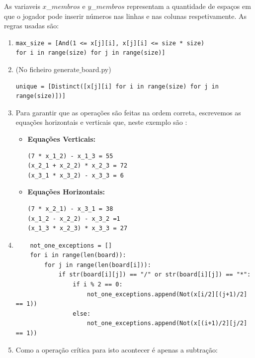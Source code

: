 \documentclass{article}
\begin{document}
As variaveis $x$\_$membros$ e $y$\_$membros$ representam a quantidade de espaços em que o jogador pode inserir números nas linhas e nas colunas respetivamente. As regras usadas são:

 \begin{enumerate}
 \item 
\begin{verbatim}
max_size = [And(1 <= x[j][i], x[j][i] <= size * size) 
for i in range(size) for j in range(size)]
\end{verbatim}

 \item \small{(No ficheiro generate$\_$board.py)}

\begin{verbatim}
unique = [Distinct([x[j][i] for i in range(size) for j in range(size)])]
\end{verbatim}

 \item Para garantir que as operações são feitas na ordem correta, escrevemos as equações horizontais e verticais que, neste exemplo são : \\
\begin{itemize}
\item {\bf{Equações Verticais:}}
\begin{verbatim}
(7 * x_1_2) - x_1_3 = 55
(x_2_1 + x_2_2) * x_2_3 = 72
(x_3_1 * x_3_2) - x_3_3 = 6
\end{verbatim}
\item {\bf{Equações Horizontais:}}
\begin{verbatim}
(7 * x_2_1) - x_3_1 = 38
(x_1_2 - x_2_2) - x_3_2 =1
(x_1_3 * x_2_3) * x_3_3 = 27
\end{verbatim}
\end{itemize}

\item 
\small{
\begin{verbatim}
    not_one_exceptions = []
    for i in range(len(board)):
        for j in range(len(board[i])):
            if str(board[i][j]) == "/" or str(board[i][j]) == "*":
                if i % 2 == 0:
                    not_one_exceptions.append(Not(x[i/2][(j+1)/2] == 1))
                else:
                    not_one_exceptions.append(Not(x[(i+1)/2][j/2] == 1))
\end{verbatim}
}

\item Como a operação crítica para isto acontecer é apenas a subtração: 


\end{enumerate}
\end{document}
